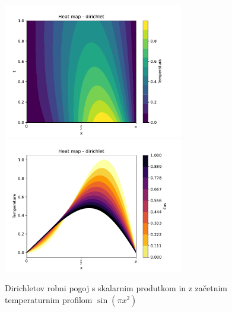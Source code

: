 \begin{figure}[h]
    \centering
    \includegraphics[width=0.7\textwidth]{pdfs/heat_map_direchlet2.pdf}
    \includegraphics[width=0.7\textwidth]{pdfs/heat_map2_direchlet2.pdf}
    \caption{Dirichletov robni pogoj s skalarnim produtkom in z začetnim temperaturnim profilom
    $\sin(\pi x^2)$}
\end{figure}
